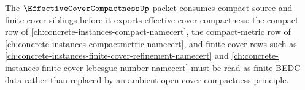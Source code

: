 The $\EffectiveCoverCompactnessUp$ packet consumes compact-source and finite-cover siblings before it exports effective cover compactness: the compact row of \autoref{ch:concrete-instances-compact-namecert}, the compact-metric row of \autoref{ch:concrete-instances-compactmetric-namecert}, and finite cover rows such as \autoref{ch:concrete-instances-finite-cover-refinement-namecert} and \autoref{ch:concrete-instances-finite-cover-lebesgue-number-namecert} must be read as finite BEDC data rather than replaced by an ambient open-cover compactness principle.
